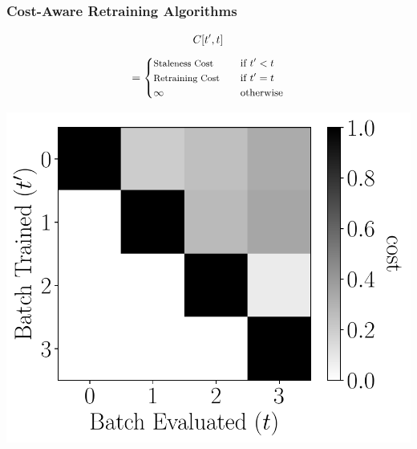 \documentclass[pdf]{beamer}
\begin{document}
\begin{frame}[fragile]
    \frametitle{Cost-Aware Retraining Algorithms}
    \begin{tcbraster}[raster columns=2, raster left skip=-0.9cm,raster right skip=-0.9cm,raster before skip=0mm]
        \begin{tcolorbox}[nobeforeafter, title=Cost Matrix,,left=0mm,top=0mm,boxsep=0.5mm]
            \begin{center}
            \begin{equation*}
                \small
                C[t^\prime,t]
            \end{equation*}
            \begin{align*}
                \small
                = \begin{cases}
                    \text{\footnotesize Staleness Cost} \quad& \text{\small if } t^\prime< t\\
                    \text{\footnotesize Retraining Cost} \quad& \text{\small if } t^\prime=t\\
                    \infty \quad&  \text{\small otherwise} 
                \end{cases}
            \end{align*}
        \end{center}
        \begin{center}
            \includegraphics[width=.78\textwidth]{figs/cost_matrix.pdf}
                    \end{center}
        \end{tcolorbox}
        \begin{tcolorbox}[nobeforeafter, title=Strategy,boxsep=0.5mm,left=0mm]
            \setlength{\leftmargini}{0.4cm}
            \begin{itemize}

\end{itemize}
\end{tcolorbox}
\end{tcbraster}
\end{frame}
\end{document}
